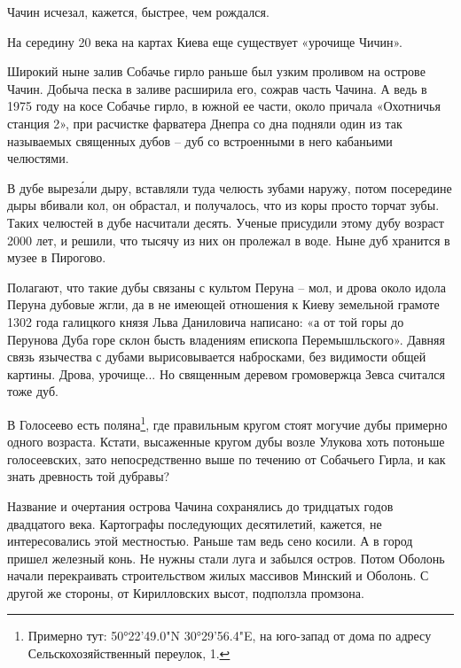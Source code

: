Чачин исчезал, кажется, быстрее, чем рождался. 

На середину 20 века на картах Киева еще существует «урочище Чичин».

Широкий ныне залив Собачье гирло раньше был узким проливом на острове Чачин. Добыча песка в заливе расширила его, сожрав часть Чачина. А ведь в 1975 году на косе Собачье гирло, в южной ее части, около причала «Охотничья станция 2», при расчистке фарватера Днепра со дна подняли один из так называемых священных дубов – дуб со встроенными в него кабаньими челюстями.

В дубе вырез\'али дыру, вставляли туда челюсть зубами наружу, потом посередине дыры вбивали кол, он обрастал, и получалось, что из коры просто торчат зубы. Таких челюстей в дубе насчитали десять. Ученые присудили этому дубу возраст 2000 лет, и решили, что тысячу из них он пролежал в воде. Ныне дуб хранится в музее в Пирогово.

Полагают, что такие дубы связаны с культом Перуна – мол, и дрова около идола Перуна дубовые жгли, да в не имеющей отношения к Киеву земельной грамоте 1302 года галицкого князя Льва Даниловича написано: «а от той горы до Перунова Дуба горе склон бысть владениям епископа Перемышльского». Давняя связь язычества с дубами вырисовывается набросками, без видимости общей картины. Дрова, урочище... Но священным деревом громовержца Зевса считался тоже дуб.

В Голосеево есть поляна\footnote{Примерно тут: 50°22'49.0"N 30°29'56.4"E, на юго-запад от дома по адресу Сельскохозяйственный переулок, 1.}, где правильным кругом стоят могучие дубы примерно одного возраста. Кстати, высаженные кругом дубы возле Улукова хоть потоньше голосеевских, зато непосредственно выше по течению от Собачьего Гирла, и как знать древность той дубравы?


Название и очертания острова Чачина сохранялись до тридцатых годов двадцатого века. Картографы последующих десятилетий, кажется, не интересовались этой местностью. Раньше там ведь сено косили. А в город пришел железный конь. Не нужны стали луга и забылся остров. Потом Оболонь начали перекраивать строительством жилых массивов Минский и Оболонь. С другой же стороны, от Кирилловских высот, подползла промзона.

